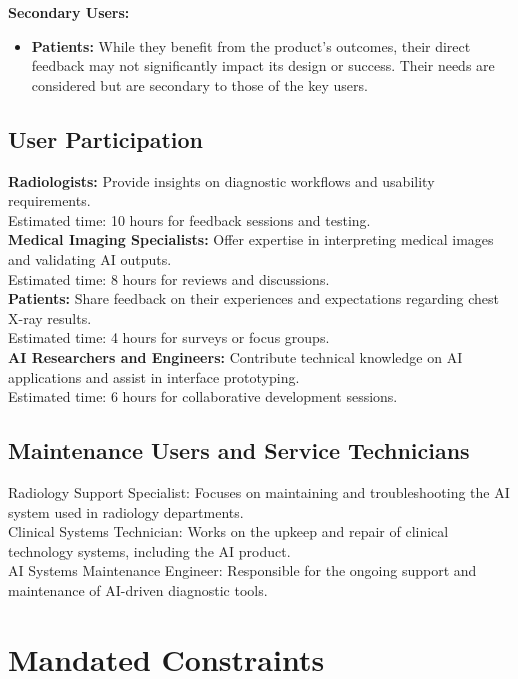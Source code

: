 \documentclass[12pt]{article}
\begin{document}
\noindent
\textbf{Secondary Users:}
\begin{itemize}
    \item{
        \textbf{Patients: } While they benefit from the product's outcomes, their direct feedback 
        may not significantly impact its design or success. Their needs are considered but are 
        secondary to those of the key users.
    }
\end{itemize}

\subsection{User Participation}
\textbf{Radiologists: } Provide insights on diagnostic workflows and usability requirements. \\
Estimated time: 10 hours for feedback sessions and testing.
\\
\noindent
\textbf{Medical Imaging Specialists: }Offer expertise in interpreting medical images and 
validating AI outputs. \\
Estimated time: 8 hours for reviews and discussions.
\\
\noindent
\textbf{Patients:} Share feedback on their experiences and expectations regarding chest X-ray 
results. \\
Estimated time: 4 hours for surveys or focus groups.
\\
\noindent
\textbf{AI Researchers and Engineers:} Contribute technical knowledge on AI applications and 
assist in interface prototyping. \\
Estimated time: 6 hours for collaborative development sessions.


\subsection{Maintenance Users and Service Technicians}
Radiology Support Specialist: Focuses on maintaining and troubleshooting the AI system used in 
radiology departments.
\\
\noindent
Clinical Systems Technician: Works on the upkeep and repair of clinical technology systems, 
including the AI product.
\\
\noindent
AI Systems Maintenance Engineer: Responsible for the ongoing support and maintenance of AI-driven 
diagnostic tools.

\section{Mandated Constraints}
\end{document}
